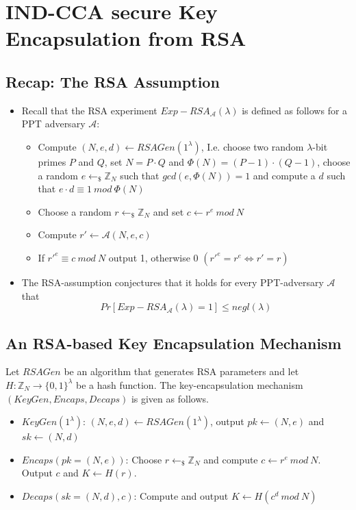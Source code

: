 

\chapter{IND-CCA secure Key Encapsulation from RSA}

    \section{Recap: The RSA Assumption}
        \begin{itemize}
            \item Recall that the RSA experiment $Exp-RSA_{\mathcal{A}}(\lambda)$ is defined as follows for a PPT adversary $\mathcal{A}$:
            \begin{itemize}
                \item Compute $(N,e,d) \leftarrow RSAGen(1^{\lambda})$, I.e. choose two random $\lambda$-bit primes $P$ and $Q$, set $N = P \cdot Q$ and $\Phi(N)=(P-1)\cdot(Q-1)$, 
                choose a random $e \leftarrow_{\$} \mathbb{Z}_N$ such that $gcd(e,\Phi(N))=1$ and compute a $d$ such that $e \cdot d \equiv 1 \ mod \ \Phi(N)$
                \item Choose a random $r \leftarrow_{\$} \mathbb{Z}_N$ and set $c \leftarrow r^e \ mod \ N$
                \item Compute $r' \leftarrow \mathcal{A}(N,e,c)$
                \item If ${r'}^e \equiv c\ mod\ N$ output 1, otherwise 0 $({r'}^e = r^e \Leftrightarrow r' = r)$
            \end{itemize}
            \item The RSA-assumption conjectures that it holds for every PPT-adversary $\mathcal{A}$ that 
            $$Pr[Exp-RSA_{\mathcal{A}}(\lambda)=1] \leq negl(\lambda)$$
        \end{itemize}
    
    \section{An RSA-based Key Encapsulation Mechanism}
        Let $RSAGen$ be an algorithm that generates RSA parameters and let $H: \mathbb{Z}_N \rightarrow \{0,1\}^{\lambda}$ be a hash function.
        The key-encapsulation mechanism $(KeyGen,Encaps,Decaps)$ is given as follows.
        \begin{itemize}
            \item $KeyGen(1^{\lambda})$: $(N,e,d) \leftarrow RSAGen(1^{\lambda})$, output $pk \leftarrow (N,e)$ and $sk \leftarrow (N,d)$
            \item $Encaps(pk=(N,e))$: Choose $r \leftarrow_{\$} \mathbb{Z}_N$ and compute $c \leftarrow r^e\ mod\ N$.
            Output $c$ and $K \leftarrow H(r)$.
            \item $Decaps(sk=(N,d),c)$: Compute and output $K \leftarrow H(c^d \ mod\ N)$
        \end{itemize}
    

